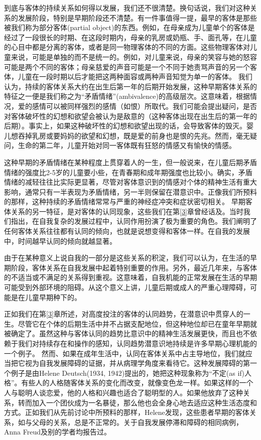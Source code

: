 \documentclass[UTF8,10pt,a4paper,openany]{book}
\begin{document}
到底与客体的持续关系如何得以发展，我们还不很清楚。换句话说，我们对这种关系的发展阶段，特别是早期阶段还不清楚。有一件事值得一提，最早的客体是那些被我们称为部分客体(partial object)的东西。例如，在母亲成为儿童单个的客体是经过了一段很长的时期、在这段时期内，母亲的乳房或奶瓶、手、面孔等，在儿童的心目中都是分离的客体，或者是同一物理客体的不同的方面。这些物理客体对儿童来说，可能是单独的而不是统一的。例如，对儿童来说，母亲的笑容与她的怒容可能是两个不同的客体；母亲慈爱的声音可能是一个不同于她责骂声音的另一个客体，儿童在一段时期以后才能把这两种面容或两种声音知觉为单一的客体。
我们认为，持续的客体关系大约在出生后第一年的后期开始发展，这种早期客体关系的特征之一便是我们称之为“矛盾情绪”(ambivalence)的高级层次。这意味着，根据情况，爱的感情可以被同样强烈的感情（如恨）所取代。我们可能会提出疑问，是否对客体破坏性的幻想和欲望会被认为是敌意的（这种客体出现在出生后的第一年的后期）。事实上，如果这种破坏性的幻想和欲望出现的话，会导致客体的毁灭。婴儿想吞掉乳房或要妈妈的欲望和幻想，既是爱的前身也是恨的先兆。然而，毫无疑问，生命的第二年，儿童开始对同一客体既有狂怒的情感又有愉快的情感。

这种早期的矛盾情绪在某种程度上贯穿着人的一生，但一般说来，在儿童后期矛盾情绪的强度比2-5岁的儿童要小些，在青春期和成年期强度也比较小。确实，矛盾情绪的减轻往往比实际更显著，尽管对客体意识到的情感对个体的精神生活有重大影响，通常只有一半表现为矛盾情绪，另一半则保留在潜意识中。正像我们所预料的那样，这种持续的矛盾情绪常常与严重的神经症冲突和症状密切相关。
早期客体关系的另一特征，是对客体的认同现象，这些我们在第\ref{3}章曾经话及。当时我们指出，在自我复杂的发展过程中，认同作用扮演了极为重要的角色。我们阐明了任何客体关系往往都有认同的倾向，也就是说想变得和客体一样。在自我的发展中，时间越早认同的倾向就越显著。

由于在某种意义上说自我的一部分是这些关系的积淀，我们可以认为，在生活的早期阶段，客体关系在自我发展中起着特别重要的作用。另外，最近几年来，与客体的不适当或不满足的关系得到重视。这意味着，自我机能的正常发展在生活的早期可能受到外部环境的阻碍。从这个意义上讲，儿童后期或成人的严重心理障碍，可能是在儿童早期种下的。

正如我们在第\ref{3}章所述，对高度投注的客体的认同趋势，在潜意识中贯穿人的一生。尽管它在个体的后期生活中并不占据支配地位，但这种地位却已在童年早期就被确定了。虽然这种与客体认同的趋势比意识中的精神生活发展更快，而且也不依赖于我们对持续存在和操作的感知，认同趋势潜意识地持续是许多早期心理机能的一个例子。
然而、如果在成年生活中，认同在客体关系中占主导地位，我们就应当把它视为自我发展障碍的证据，并从病理学角度来看待它。这种发展障碍的第一个例子是由Helene Deutsch(1934, 1942)提出的，她把这种现象称为“不定(as if)人格”。有些人的人格随客体关系的变化而改变，就像变色龙一样。如果这样的一个人与聪明人谈恋爱，他的人格和兴趣也适合了聪明型的人。如果他放弃了这种关系，转而加入一个团伙成为一名暴徒，那么他也会全身心地去适应这种生活态度和方式。正如我们从先前讨论中所预料的那样，Helene发现，这些患者早期的客体关系，如与父母的关系，总是不正常的。关于自我发展停滞和障碍的相同病例，Anna Freud及别的学者均报告过。
\end{document}
